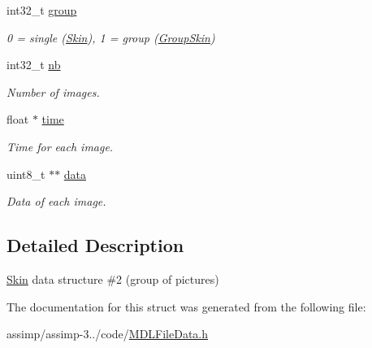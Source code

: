 \begin{DoxyCompactItemize}
\item 
\hypertarget{struct_assimp_1_1_m_d_l_1_1_group_skin_ad82fc66e926b7eeb8816618232c05c31}{int32\+\_\+t \hyperlink{struct_assimp_1_1_m_d_l_1_1_group_skin_ad82fc66e926b7eeb8816618232c05c31}{group}}\label{struct_assimp_1_1_m_d_l_1_1_group_skin_ad82fc66e926b7eeb8816618232c05c31}

\begin{DoxyCompactList}\small\item\em 0 = single (\hyperlink{struct_assimp_1_1_m_d_l_1_1_skin}{Skin}), 1 = group (\hyperlink{struct_assimp_1_1_m_d_l_1_1_group_skin}{Group\+Skin}) \end{DoxyCompactList}\item 
\hypertarget{struct_assimp_1_1_m_d_l_1_1_group_skin_a84f3495246ac32a54fe0045a91e2d8d3}{int32\+\_\+t \hyperlink{struct_assimp_1_1_m_d_l_1_1_group_skin_a84f3495246ac32a54fe0045a91e2d8d3}{nb}}\label{struct_assimp_1_1_m_d_l_1_1_group_skin_a84f3495246ac32a54fe0045a91e2d8d3}

\begin{DoxyCompactList}\small\item\em Number of images. \end{DoxyCompactList}\item 
\hypertarget{struct_assimp_1_1_m_d_l_1_1_group_skin_a737e89a0aaa6b227225ef6adb15a873b}{float $\ast$ \hyperlink{struct_assimp_1_1_m_d_l_1_1_group_skin_a737e89a0aaa6b227225ef6adb15a873b}{time}}\label{struct_assimp_1_1_m_d_l_1_1_group_skin_a737e89a0aaa6b227225ef6adb15a873b}

\begin{DoxyCompactList}\small\item\em Time for each image. \end{DoxyCompactList}\item 
\hypertarget{struct_assimp_1_1_m_d_l_1_1_group_skin_a3510d84e1fc0a2e3b8315bebdf7e8ddf}{uint8\+\_\+t $\ast$$\ast$ \hyperlink{struct_assimp_1_1_m_d_l_1_1_group_skin_a3510d84e1fc0a2e3b8315bebdf7e8ddf}{data}}\label{struct_assimp_1_1_m_d_l_1_1_group_skin_a3510d84e1fc0a2e3b8315bebdf7e8ddf}

\begin{DoxyCompactList}\small\item\em Data of each image. \end{DoxyCompactList}\end{DoxyCompactItemize}


\subsection{Detailed Description}
\hyperlink{struct_assimp_1_1_m_d_l_1_1_skin}{Skin} data structure \#2 (group of pictures) 

The documentation for this struct was generated from the following file\+:\begin{DoxyCompactItemize}
\item 
assimp/assimp-\/3../code/\hyperlink{_m_d_l_file_data_8h}{M\+D\+L\+File\+Data.\+h}\end{DoxyCompactItemize}
